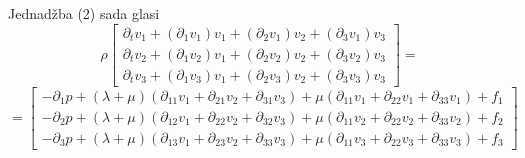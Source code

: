 \documentclass[a4paper,oneside,12pt]{memoir} %
\begin{document}
Jednadžba (2) sada glasi
\[
\rho
\begin{bmatrix}
\partial_t v_1 + (\partial_1 v_1)v_1 + (\partial_2 v_1)v_2 + (\partial_3 v_1)v_3 \\
\partial_t v_2 + (\partial_1 v_2)v_1 + (\partial_2 v_2)v_2 + (\partial_3 v_2)v_3 \\
\partial_t v_3 + (\partial_1 v_3)v_1 + (\partial_2 v_3)v_2 + (\partial_3 v_3)v_3
\end{bmatrix}
=
\]
\[ =
\begin{bmatrix}
    -\partial_1 p + (\lambda + \mu) (\partial_{11} v_1 + \partial_{21} v_2 + \partial_{31} v_3) + \mu (\partial_{11} v_1 + \partial_{22} v_1 + \partial_{33} v_1) + f_1 \\
    -\partial_2 p + (\lambda + \mu) (\partial_{12} v_1 + \partial_{22} v_2 + \partial_{32} v_3) + \mu (\partial_{11} v_2 + \partial_{22} v_2 + \partial_{33} v_2) + f_2\\
    -\partial_3 p + (\lambda + \mu) (\partial_{13} v_1 + \partial_{23} v_2 + \partial_{33} v_3) + \mu (\partial_{11} v_3 + \partial_{22} v_3 + \partial_{33} v_3) + f_3
\end{bmatrix}
\]
\end{document}
